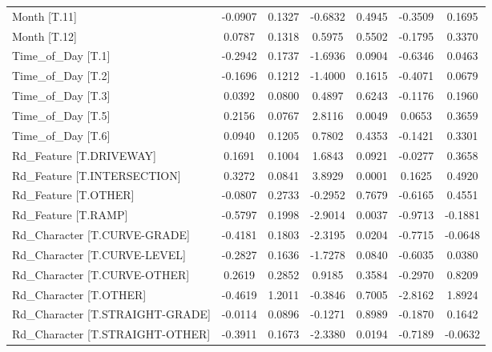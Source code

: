 \begin{longtable}{p{4cm}cccccc}
Month [T.11]                                  & -0.0907 &    0.1327 & -0.6832 &       0.4945 & -0.3509 &  0.1695 \\
Month [T.12]                                  &  0.0787 &    0.1318 &  0.5975 &       0.5502 & -0.1795 &  0.3370 \\
Time\_of\_Day [T.1]                             & -0.2942 &    0.1737 & -1.6936 &       0.0904 & -0.6346 &  0.0463 \\
Time\_of\_Day [T.2]                             & -0.1696 &    0.1212 & -1.4000 &       0.1615 & -0.4071 &  0.0679 \\
Time\_of\_Day [T.3]                             &  0.0392 &    0.0800 &  0.4897 &       0.6243 & -0.1176 &  0.1960 \\
Time\_of\_Day [T.5]                             &  0.2156 &    0.0767 &  2.8116 &       0.0049 &  0.0653 &  0.3659 \\
Time\_of\_Day [T.6]                             &  0.0940 &    0.1205 &  0.7802 &       0.4353 & -0.1421 &  0.3301 \\
Rd\_Feature [T.DRIVEWAY]                       &  0.1691 &    0.1004 &  1.6843 &       0.0921 & -0.0277 &  0.3658 \\
Rd\_Feature [T.INTERSECTION]                   &  0.3272 &    0.0841 &  3.8929 &       0.0001 &  0.1625 &  0.4920 \\
Rd\_Feature [T.OTHER]                          & -0.0807 &    0.2733 & -0.2952 &       0.7679 & -0.6165 &  0.4551 \\
Rd\_Feature [T.RAMP]                           & -0.5797 &    0.1998 & -2.9014 &       0.0037 & -0.9713 & -0.1881 \\
Rd\_Character [T.CURVE-GRADE]                  & -0.4181 &    0.1803 & -2.3195 &       0.0204 & -0.7715 & -0.0648 \\
Rd\_Character [T.CURVE-LEVEL]                  & -0.2827 &    0.1636 & -1.7278 &       0.0840 & -0.6035 &  0.0380 \\
Rd\_Character [T.CURVE-OTHER]                  &  0.2619 &    0.2852 &  0.9185 &       0.3584 & -0.2970 &  0.8209 \\
Rd\_Character [T.OTHER]                        & -0.4619 &    1.2011 & -0.3846 &       0.7005 & -2.8162 &  1.8924 \\
Rd\_Character [T.STRAIGHT-GRADE]               & -0.0114 &    0.0896 & -0.1271 &       0.8989 & -0.1870 &  0.1642 \\
Rd\_Character [T.STRAIGHT-OTHER]               & -0.3911 &    0.1673 & -2.3380 &       0.0194 & -0.7189 & -0.0632 \\

\end{longtable}
